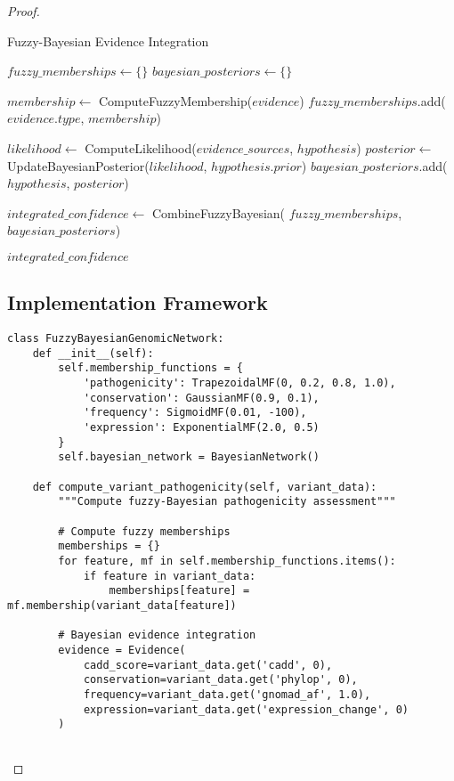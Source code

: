 \documentclass[12pt,a4paper]{article}
\begin{document}
\begin{proof}
\begin{algorithm}
\caption{Fuzzy-Bayesian Evidence Integration}
\begin{algorithmic}
    \State $fuzzy\_memberships \gets \{\}$
    \State $bayesian\_posteriors \gets \{\}$
    
        \State $membership \gets$ ComputeFuzzyMembership($evidence$)
        \State $fuzzy\_memberships$.add($evidence.type$, $membership$)
    \EndFor
    
        \State $likelihood \gets$ ComputeLikelihood($evidence\_sources$, $hypothesis$)
        \State $posterior \gets$ UpdateBayesianPosterior($likelihood$, $hypothesis.prior$)
        \State $bayesian\_posteriors$.add($hypothesis$, $posterior$)
    \EndFor
    
    \State $integrated\_confidence \gets$ CombineFuzzyBayesian(
        $fuzzy\_memberships$, $bayesian\_posteriors$)
    
    \State \Return $integrated\_confidence$
\EndProcedure
\end{algorithmic}
\end{algorithm}

\subsection{Implementation Framework}

\begin{lstlisting}[style=pythonstyle, caption=Fuzzy-Bayesian Network Implementation]
class FuzzyBayesianGenomicNetwork:
    def __init__(self):
        self.membership_functions = {
            'pathogenicity': TrapezoidalMF(0, 0.2, 0.8, 1.0),
            'conservation': GaussianMF(0.9, 0.1),
            'frequency': SigmoidMF(0.01, -100),
            'expression': ExponentialMF(2.0, 0.5)
        }
        self.bayesian_network = BayesianNetwork()
        
    def compute_variant_pathogenicity(self, variant_data):
        """Compute fuzzy-Bayesian pathogenicity assessment"""
        
        # Compute fuzzy memberships
        memberships = {}
        for feature, mf in self.membership_functions.items():
            if feature in variant_data:
                memberships[feature] = mf.membership(variant_data[feature])
        
        # Bayesian evidence integration
        evidence = Evidence(
            cadd_score=variant_data.get('cadd', 0),
            conservation=variant_data.get('phylop', 0),
            frequency=variant_data.get('gnomad_af', 1.0),
            expression=variant_data.get('expression_change', 0)
        )
        

\end{lstlisting}
\end{proof}
\end{document}
